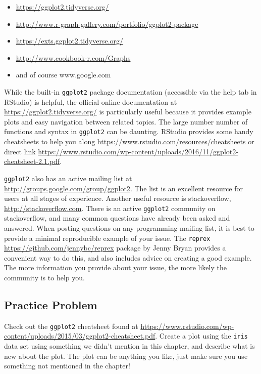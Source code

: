 \documentclass[
]{krantz}
\providecommand{\tightlist}{%
  \setlength{\itemsep}{0pt}\setlength{\parskip}{0pt}}
\begin{document}
\begin{itemize}
\tightlist
\item
  \url{https://ggplot2.tidyverse.org/}
\item
  \url{http://www.r-graph-gallery.com/portfolio/ggplot2-package}
\item
  \url{https://exts.ggplot2.tidyverse.org/}
\item
  \url{http://www.cookbook-r.com/Graphs}
\item
  and of course www.google.com
\end{itemize}

While the built-in \texttt{ggplot2} package documentation (accessible via the help tab in RStudio) is helpful, the official online documentation at \url{https://ggplot2.tidyverse.org/} is particularly useful because it provides example plots and easy navigation between related topics. The large number number of functions and syntax in \texttt{ggplot2} can be daunting. RStudio provides some handy cheatsheets to help you along \url{https://www.rstudio.com/resources/cheatsheets} or direct link \url{https://www.rstudio.com/wp-content/uploads/2016/11/ggplot2-cheatsheet-2.1.pdf}.

\texttt{ggplot2} also has an active mailing list at \url{http://groups.google.com/group/ggplot2}. The list is an excellent resource for users at all stages of experience. Another useful resource is stackoverflow, \url{http://stackoverflow.com}. There is an active \texttt{ggplot2} community on stackoverflow, and many common questions have already been asked and answered. When posting questions on any programming mailing list, it is best to provide a minimal reproducible example of your issue. The \texttt{reprex} \url{https://github.com/jennybc/reprex} package by Jenny Bryan provides a convenient way to do this, and also includes advice on creating a good example. The more information you provide about your issue, the more likely the community is to help you.

\hypertarget{ch5PP2}{%
\subsection{Practice Problem}\label{ch5PP2}}

Check out the \texttt{ggplot2} cheatsheet found at \url{https://www.rstudio.com/wp-content/uploads/2015/03/ggplot2-cheatsheet.pdf}. Create a plot using the \texttt{iris} data set using something we didn't mention in this chapter, and describe what is new about the plot. The plot can be anything you like, just make sure you use something not mentioned in the chapter!
\end{document}
